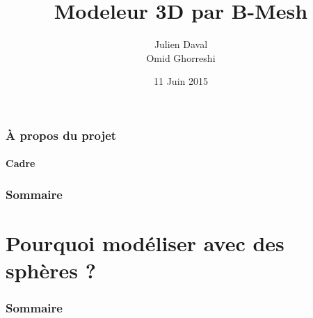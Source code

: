 \documentclass[9pt]{beamer}
\title{Modeleur 3D par B-Mesh}
\author{Julien Daval \\ Omid Ghorreshi}
\institute[Ensimag 2A]{2ème année Ensimag}
\date{11 Juin 2015}
\begin{document}
\begin{frame}
	\titlepage
\end{frame}

\begin{frame}
	\frametitle{À propos du projet}
	\framesubtitle{Cadre}
\end{frame}


\begin{frame}
	\frametitle{Sommaire}
	\tableofcontents
\end{frame}

\section{Pourquoi modéliser avec des sphères ?}

\begin{frame}
	\frametitle{Sommaire}
	\tableofcontents[currentsection]
\end{frame}
\end{document}
